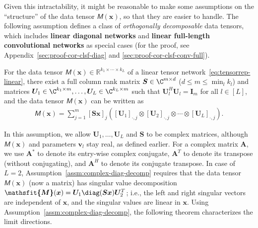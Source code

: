 \documentclass{article} %
\def\vs{{\bm{s}}}
\def\vv{{\bm{v}}}
\def\vx{{\bm{x}}}
\def\mA{{\bm{A}}}
\def\mI{{\bm{I}}}
\def\mS{{\bm{S}}}
\def\mU{{\bm{U}}}
\newcommand{\tens}[1]{\bm{\mathsfit{#1}}}
\def\tA{{\tens{A}}}
\def\tM{{\tens{M}}}
\newcommand{\R}{\mathbb{R}}
\begin{document}
Given this intractability, it might be reasonable to make some assumptions on the ``structure'' of the data tensor $\tM(\vx)$, so that they are easier to handle. The following assumption defines a class of \emph{orthogonally decomposable} data tensors, which includes \textbf{linear diagonal networks} and \textbf{linear full-length convolutional networks} as special cases (for the proof, see Appendix~\ref{sec:proof-cor-clsf-diag} and \ref{sec:proof-cor-clsf-conv-full}).
\begin{assumption}
\label{assm:complex-diag-decomp}
For the data tensor $\tM(\vx) \in \R^{k_1 \times \cdots \times k_L}$ of a linear tensor network~\eqref{eq:tensorrep-linear}, there exist  a full column rank matrix $\mS \in \C^{m \times d}$ \textup{($d \leq m \leq \min_l k_l$)} and matrices $\mU_1 \in \C^{k_1 \times m}, \dots, \mU_L \in \C^{k_L \times m}$ such that $\mU_l^H \mU_l = \mI_{m}$ for all $l \in [L]$, and the data tensor $\tM(\vx)$ can be written as
\begin{align}
\label{eq:tensor-orth-decomp}
\tM(\vx) = \sum\nolimits_{j=1}^m [\mS \vx]_j ([\mU_1]_{\cdot,j} \otimes [\mU_2]_{\cdot,j} \otimes \cdots \otimes [\mU_L]_{\cdot,j}
).
\end{align}
\end{assumption}
In this assumption, we allow $\mU_1, \dots, \mU_L$ and $\mS$ to be complex matrices, although $\tM(\vx)$ and parameters $\vv_l$ stay real, as defined earlier.
For a complex matrix $\mA$, we use 
$\mA^*$ to denote its entry-wise complex conjugate,
$\mA^T$ to denote its transpose (without conjugating), and $\mA^H$ to denote its conjugate transpose.
In case of $L = 2$, Assumption~\ref{assm:complex-diag-decomp} requires that the data tensor $\tM(\vx)$ (now a matrix) has singular value decomposition $\tM(\vx) = \mU_1 \diag(\mS \vx) \mU_2^T$; i.e., the left and right singular vectors are independent of $\vx$, and the singular values are linear in $\vx$.
Using Assumption~\ref{assm:complex-diag-decomp}, the following theorem characterizes the limit directions.

\end{document}

